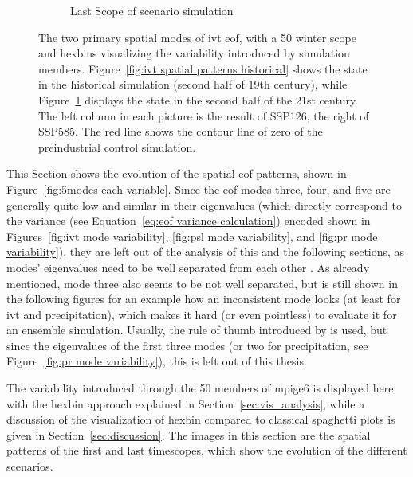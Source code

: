 \begin{figure}[htb]
\begin{subfigure}[b]{0.49\textwidth}
    \caption{Last Scope of scenario simulation}
    \label{fig:ivt spatial patterns endscenario}
  \end{subfigure}
  \caption[IVT Spatial Modes Evolution]{The two primary spatial modes of \ac{ivt} \ac{eof}, with a 50 winter scope and hexbins visualizing the variability introduced by simulation members. Figure~\ref{fig:ivt spatial patterns historical} shows the state in the historical simulation (second half of 19th century), while Figure~\ref{fig:ivt spatial patterns endscenario} displays the state in the second half of the 21st century. The left column in each picture is the result of SSP126, the right of SSP585. The red line shows the contour line of zero of the preindustrial control simulation. }\label{fig:ivt eof evolution}
\end{figure}

This Section shows the evolution of the spatial \ac{eof} patterns, shown in Figure~\ref{fig:5modes each variable}. 
Since the \ac{eof} modes three, four, and five are generally quite low and similar in their eigenvalues (which directly correspond to the variance (see Equation~\ref{eq:eof variance calculation}) encoded shown in Figures~\ref{fig:ivt mode variability}, \ref{fig:psl mode variability}, and \ref{fig:pr mode variability}), they are left out of the analysis of this and the following sections, as modes' eigenvalues need to be well separated from each other \cite{hannachi_empirical_2007}. 
As already mentioned, mode three also seems to be not well separated, but is still shown in the following figures for an example how an inconsistent mode looks (at least for \ac{ivt} and precipitation), which makes it hard (or even pointless) to evaluate it for an ensemble simulation.  
Usually, the rule of thumb introduced by  is used, but since the eigenvalues of the first three modes (or two for precipitation, see Figure~\ref{fig:pr mode variability}), this is left out of this thesis. 

The variability introduced through the 50 members of \ac{mpige6} is displayed here with the hexbin approach explained in Section~\ref{sec:vis_analysis}, while a discussion of the visualization of hexbin compared to classical spaghetti plots is given in Section~\ref{sec:discussion}.
The images in this section are the spatial patterns of the first and last timescopes, which show the evolution of the different scenarios.


